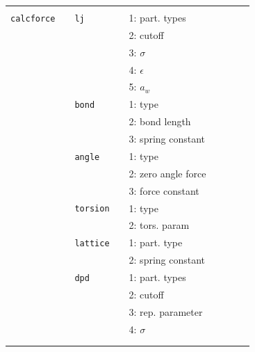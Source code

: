 \documentclass[11pt]{article}
\begin{document}
\begin{center}
\begin{tabular}{cclclclll}
                                   && && && \\
    \hline
                                   && && && \\
    \verb!calcforce! && \verb!lj! && 1: part. types && \\
                                   && && 2: cutoff&& \\
                                   && && 3: $\sigma$ && \\
                                   && && 4: $\epsilon$ && \\
                                   && && 5: $a_w$ && \\
                    && \verb!bond! && 1: type && \\  
                    &&             && 2: bond length && \\
                    &&             && 3: spring constant && \\
                    && \verb!angle!&& 1: type && \\  
                    &&             && 2: zero angle force && \\
                    &&             && 3: force constant && \\            
                    && \verb!torsion! && 1: type && \\  
                    &&             && 2: tors. param && \\
                    && \verb!lattice! && 1: part. type && \\
                    &&               && 2: spring constant && \\   
                    && \verb!dpd! && 1: part. types && \\
                    &&            && 2: cutoff && \\  
                    &&            && 3: rep. parameter && \\ 
                    &&            && 4: $\sigma$ && \\
                                   && && && \\
    \hline
    && && && 
  \end{tabular}

\end{center}
\end{document}
